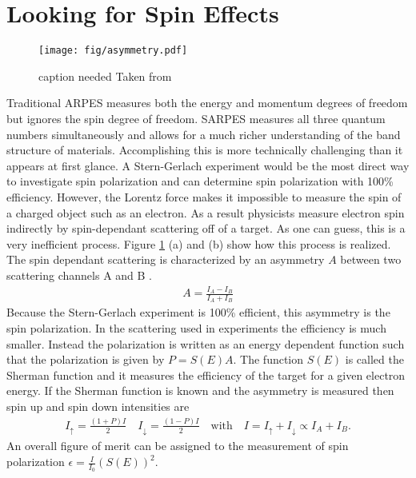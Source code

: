 \documentclass[12pt]{article}
\begin{document}
\section{Looking for Spin Effects}
\begin{figure}[h]
  \centering
  \texttt{[image: fig/asymmetry.pdf]}
  \caption[should I put this here?]
  {caption needed Taken from \cite{Okuda-Kimura}}
  \label{fig:asymmetry}
\end{figure}
Traditional ARPES measures both the energy and momentum degrees of freedom but ignores the spin degree of freedom.
SARPES measures all three quantum numbers simultaneously and allows for a much richer understanding of the band structure of materials.
Accomplishing this is more technically challenging than it appears at first glance.
A Stern-Gerlach experiment would be the most direct way to investigate spin polarization and can determine spin polarization with 100\% efficiency.
However, the Lorentz force makes it impossible to measure the spin of a charged object such as an electron.
As a result physicists measure electron spin indirectly by spin-dependant scattering off of a target.
As one can guess, this is a very inefficient process.
Figure \ref{fig:asymmetry} (a) and (b) show how this process is realized.
The spin dependant scattering is characterized by an asymmetry $A$ between two scattering channels A and B \cite{Okuda-Kimura}.
\begin{align}
  A=\frac{I_A-I_B}{I_A+I_B}
\end{align}
Because the Stern-Gerlach experiment is 100\% efficient, this asymmetry is the spin polarization.
In the scattering used in experiments the efficiency is much smaller.
Instead the polarization is written as an energy dependent function such that the polarization is given by $P=S(E)A$.
The function $S(E)$ is called the Sherman function and it measures the efficiency of the target for a given electron energy.
If the Sherman function is known and the asymmetry is measured then spin up and spin down intensities are
\begin{align}
  I_{\uparrow}=\frac{(1+P)I}{2}\quad I_{\downarrow}=\frac{(1-P)I}{2}\quad \text{with}\quad I=I_{\uparrow}+I_{\downarrow}\propto I_A+I_B\text{.}
\end{align}
An overall figure of merit can be assigned to the measurement of spin polarization $\epsilon=\frac{I}{I_0}(S(E))^2$.
\end{document}
